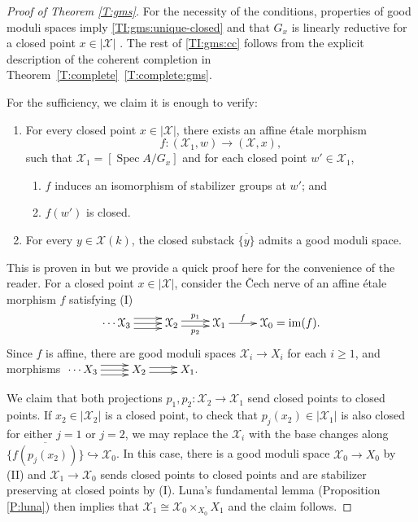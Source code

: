 \documentclass[a4paper]{amsart}
\theoremstyle{plain}
\theoremstyle{definition}
\theoremstyle{remark}
\numberwithin{equation}{section}
\newcommand{\inj}{\hookrightarrow} %
\newcommand\cX{\mathcal{X}}
\newcommand\co{\colon}
\DeclareMathOperator{\Spec}{Spec}
\newcommand{\itemref}[1]{\eqref{#1}}
\DeclareMathOperator{\im}{im}
\begin{document}
\begin{proof}[Proof of Theorem \ref{T:gms}]
For the necessity of the conditions, properties of good moduli spaces imply \itemref{TI:gms:unique-closed}  \cite[Thm.\ 4.16(ix)]{alper-good} and that $G_x$ is linearly reductive for a closed point $x \in |\cX|$ \cite[Prop.\ 12.14]{alper-good}.  The rest of \itemref{TI:gms:cc} follows from the explicit description of the coherent completion in Theorem~\ref{T:complete}~\itemref{T:complete:gms}.


For the sufficiency, we claim it is enough to verify:
\begin{enumerate}
\item[(I)] For every closed point $x \in |\cX|$, there exists an affine \'etale morphism
$$f \co (\cX_1, w) \to (\cX, x),$$ such that $\cX_1 = [\Spec A / G_x]$ and for each closed point $w' \in \cX_1$,
\begin{enumerate}
\item $f$ induces an isomorphism of stabilizer groups at $w'$; and
\item  $f(w')$ is closed.
\end{enumerate}
\item[(II)] For every $y \in \cX(k)$, the closed substack $\overline{ \{y\}}$ admits a good moduli space.
\end{enumerate}
This is proven in \cite[Thm.~1.2]{afsw-good} but we provide a quick proof here for the convenience of the reader.  For a closed point $x \in |\cX|$, consider the \v{C}ech nerve of an affine \'etale morphism $f$ satisfying (I)
\[
\xymatrix{ \cdots    \cX_3 \ar@<-1ex>[r] \ar[r] \ar@<1ex>[r]  &  \cX_2 \ar@<.5ex>[r]^{\smash{p_1}} \ar@<-.5ex>[r]_{p_2} & \cX_1 \ar[r]^-{\smash{f}} & \cX_0 = \im(f).
}
\]
Since $f$ is affine, there are good moduli spaces $\cX_i \to X_i$ for each $i \ge 1$, and morphisms $\xymatrix{\cdots  X_3  \ar@<1ex>[r] \ar@<-1ex>[r] \ar[r]  & X_2 \ar@<.5ex>[r] \ar@<-.5ex>[r]  & X_1.}$

We claim that both projections $p_1, p_2 \co \cX_2 \to \cX_1$ send closed points to closed points.  If $x_2 \in |\cX_2|$ is a closed point, to check that $p_j(x_2) \in |\cX_1|$ is also closed for either $j=1$ or $j=2$,  we may replace the $\cX_i$ with the base changes along $\overline{ \{f(p_j(x_2))\}}\inj \cX_0$.  In this case, there is a good moduli space $\cX_0\to X_0$ by (II) and $\cX_1\to \cX_0$ sends closed points to closed points and are stabilizer preserving at closed points by (I).
Luna's fundamental lemma (Proposition \ref{P:luna}) then implies that $\cX_1 \cong \cX_0 \times_{X_0} X_1$ and the claim follows.


\end{proof}
\end{document}
